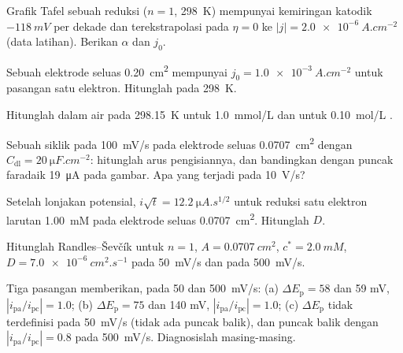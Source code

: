 \begin{exercise}[$\star$]\label{exo:b3:electrode-kinetics:1}
Grafik Tafel sebuah reduksi ($n = 1$, \qty{298}{K}) mempunyai kemiringan katodik
$-\qty{118}{mV}$ per dekade dan terekstrapolasi pada $\eta = 0$ ke
$|j| = \qty{2.0e-6}{A.cm^{-2}}$ (data latihan). Berikan $\alpha$ dan $j_0$.
\end{exercise}

\begin{exercise}[$\star$]\label{exo:b3:electrode-kinetics:2}
Sebuah elektrode seluas \qty{0.20}{cm^2} mempunyai $j_0 = \qty{1.0e-3}{A.cm^{-2}}$
untuk pasangan satu elektron. Hitunglah  pada
\qty{298}{K}.
\end{exercise}

\begin{exercise}[$\star$]\label{exo:b3:electrode-kinetics:3}
Hitunglah  dalam air pada \qty{298.15}{K} untuk \qty{1.0}{mmol/L}
dan untuk \qty{0.10}{mol/L} .
\end{exercise}

\begin{exercise}[$\star$]\label{exo:b3:electrode-kinetics:4}
Sebuah  siklik pada \qty{100}{mV/s} pada elektrode seluas
\qty{0.0707}{cm^2} dengan $C_{\mathrm{dl}} =
\qty{20}{\micro F.cm^{-2}}$: hitunglah arus pengisiannya, dan bandingkan dengan
puncak faradaik \qty{19}{\micro A} pada gambar. Apa yang terjadi pada
\qty{10}{V/s}?
\end{exercise}

\begin{exercise}[$\star\star$]\label{exo:b3:electrode-kinetics:5}
Setelah lonjakan potensial, $i\sqrt t = \qty{12.2}{\micro A.s^{1/2}}$ untuk reduksi satu
elektron larutan \qty{1.00}{mM} pada elektrode seluas \qty{0.0707}{cm^2}.
Hitunglah $D$.
\end{exercise}

\begin{exercise}[$\star\star$]\label{exo:b3:electrode-kinetics:6}
Hitunglah  Randles--Ševčík untuk $n = 1$, $A = \qty{0.0707}{cm^2}$,
$c^* = \qty{2.0}{mM}$, $D = \qty{7.0e-6}{cm^2.s^{-1}}$ pada \qty{50}{mV/s} dan pada
\qty{500}{mV/s}.
\end{exercise}

\begin{exercise}[$\star\star$]\label{exo:b3:electrode-kinetics:7}
Tiga pasangan memberikan, pada 50 dan \qty{500}{mV/s}: (a) $\Delta E_{\mathrm p} = 58$
dan 59 mV, $|i_{\mathrm{pa}}/i_{\mathrm{pc}}| = 1.0$; (b) $\Delta E_{\mathrm p} = 75$ dan 140 mV,
$|i_{\mathrm{pa}}/i_{\mathrm{pc}}| = 1.0$; (c) $\Delta E_{\mathrm p}$ tidak terdefinisi pada
\qty{50}{mV/s} (tidak ada puncak balik), dan puncak balik dengan
$|i_{\mathrm{pa}}/i_{\mathrm{pc}}| = 0.8$ pada \qty{500}{mV/s}. Diagnosislah
masing-masing.
\end{exercise}

